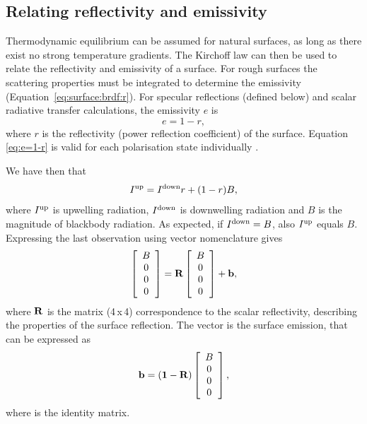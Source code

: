 \subsection{Relating reflectivity and emissivity}
 Thermodynamic equilibrium can be assumed for natural surfaces, as
 long as there exist no strong temperature gradients. The Kirchoff law
 can then be used to relate the reflectivity and emissivity of a
 surface. For rough surfaces the scattering properties must be
 integrated to determine the
 emissivity (Equation~\ref{eq:surface:brdf:r}). For specular
 reflections (defined below) and scalar radiative transfer
 calculations, the emissivity $e$ is
 \begin{equation}
  \label{eq:e=1-r}
   e = 1 - r,
 \end{equation}
 where $r$ is the reflectivity (power reflection coefficient) of the
 surface.  Equation \ref{eq:e=1-r} is valid for each polarisation state
 individually \citep[Eq.\ 4.190a]{ulaby:81}.

 We have then that
 \begin{equation}
  I^\mathrm{up} = I^\mathrm{down}r + (1-r)B,
 \end{equation}
 where $I^\mathrm{up}$ is upwelling radiation, $I^\mathrm{down}$
 is downwelling radiation and $B$ is the magnitude of blackbody
 radiation. As expected, if $I^\mathrm{down}=B$, also
 $I^\mathrm{up}$ equals $B$.  Expressing the last observation using
 vector nomenclature gives
 \begin{equation}
   \left[\begin{array}{c} B \\ 0 \\0\\0 \end{array}\right] =
  \mathbf{R} \left[\begin{array}{c} B \\ 0 \\0\\0 \end{array}\right] + 
  \mathbf{b},
 \end{equation}
 where $\mathbf{R}$ is the matrix (4\,x\,4) correspondence to the
 scalar reflectivity, describing the properties of the surface
 reflection. The vector  is the surface emission, that
 can be expressed as
 \begin{equation}
  \label{eq:surface:bvector} 
  \mathbf{b} = (\mathbf{1}-\mathbf{R})
      \left[\begin{array}{c} B \\ 0 \\0\\0 \end{array}\right],
 \end{equation}
 where  is the identity matrix. 



